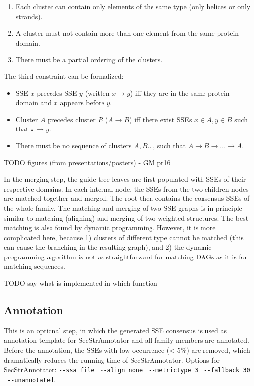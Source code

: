 \documentclass[12pt,draft]{article}
\providecommand{\tightlist}{%
  \setlength{\itemsep}{0pt}\setlength{\parskip}{0pt}}
\let\oldtexttt\texttt
\renewcommand{\texttt}[1]{\textcolor{CodeColor}{\oldtexttt{#1}}}
\begin{document}
\begin{enumerate}
\def\labelenumi{\arabic{enumi}.}
\tightlist
\item
  Each cluster can contain only elements of the same type (only helices
  or only strands).
\item
  A cluster must not contain more than one element from the same protein
  domain.
\item
  There must be a partial ordering of the clusters.
\end{enumerate}

The third constraint can be formalized:

\begin{itemize}
\tightlist
\item
  SSE \(x\) precedes SSE \(y\) (written \(x \rightarrow y\)) iff they
  are in the same protein domain and \(x\) appears before \(y\).
\item
  Cluster \(A\) precedes cluster \(B\) (\(A \rightarrow B\)) iff there
  exist SSEs \(x \in A, y \in B\) such that \(x \rightarrow y\).
\item
  There must be no sequence of clusters \(A, B...\), such that
  \(A \rightarrow B \rightarrow ... \rightarrow A\).
\end{itemize}

TODO figures (from presentations/posters) - GM pr16

In the merging step, the guide tree leaves are first populated with SSEs
of their respective domains. In each internal node, the SSEs from the
two children nodes are matched together and merged. The root then
contains the consensus SSEs of the whole family. The matching and
merging of two SSE graphs is in principle similar to matching (aligning)
and merging of two weighted structures. The best matching is also found
by dynamic programming. However, it is more complicated here, because 1)
clusters of different type cannot be matched (this can cause the
branching in the resulting graph), and 2) the dynamic programming
algorithm is not as straightforward for matching DAGs as it is for
matching sequences.

TODO say what is implemented in which function

\hypertarget{annotation}{%
\subsection{Annotation}\label{annotation}}

This is an optional step, in which the generated SSE consensus is used
as annotation template for SecStrAnnotator and all family members are
annotated. Before the annotation, the SSEs with low occurrence
(\textless{} 5\%) are removed, which dramatically reduces the running
time of SecStrAnnotator. Options for SecStrAnnotator:
\texttt{-\/-ssa\ file} ~\texttt{-\/-align\ none}
~\texttt{-\/-metrictype\ 3} ~\texttt{-\/-fallback\ 30}
~\texttt{-\/-unannotated}.
\end{document}
